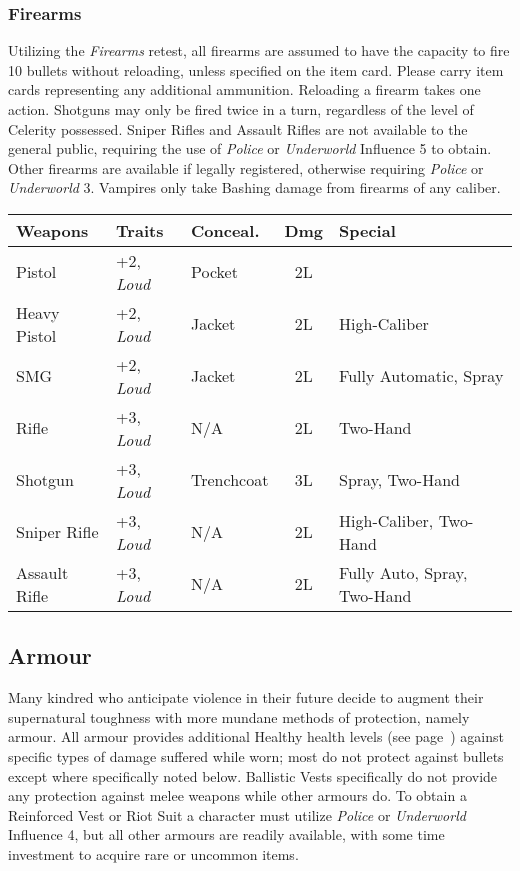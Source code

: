 \subsubsection{Firearms}
Utilizing the \emph{Firearms} retest, all firearms are assumed to have the capacity to 
fire 10 bullets without reloading, unless specified on the item card.  Please carry item 
cards representing any additional ammunition.  Reloading a firearm takes one action.  
Shotguns may only be fired twice in a turn, regardless of the level of Celerity possessed.  
Sniper Rifles and Assault Rifles are not available to the general public, requiring the 
use of \emph{Police} or \emph{Underworld} Influence 5 to obtain.  Other firearms are 
available if legally registered, otherwise requiring \emph{Police} or \emph{Underworld} 3. 
Vampires only take Bashing damage from firearms of any caliber.  \\

{\footnotesize
\begin{tabular}{|l l l c l|}
	\hline
	\textbf{Weapons} & \textbf{Traits} & \textbf{Conceal.} & 
	\textbf{Dmg} & \textbf{Special} \\
	\hline
	Pistol & +2, \emph{Loud} & Pocket & 2L & \\
	Heavy Pistol & +2, \emph{Loud} & Jacket & 2L & High-Caliber \\
	SMG & +2, \emph{Loud} & Jacket & 2L & Fully Automatic, Spray \\
	Rifle & +3, \emph{Loud} & N/A & 2L & Two-Hand \\
	Shotgun & +3, \emph{Loud} & Trenchcoat & 3L & Spray, Two-Hand \\
	Sniper Rifle & +3, \emph{Loud} & N/A & 2L & High-Caliber, Two-Hand \\
	Assault Rifle & +3, \emph{Loud} & N/A & 2L & Fully Auto, Spray, Two-Hand \\
	\hline
\end{tabular}
}

\subsection{Armour}
Many kindred who anticipate violence in their future decide to augment their supernatural 
toughness with more mundane methods of protection, namely armour.  All armour provides 
additional Healthy health levels (see page~\pageref{sec:health}) against specific types 
of damage suffered while worn; most do not protect against bullets except where specifically 
noted below.  Ballistic Vests specifically do not provide any protection against melee weapons 
while other armours do.  To obtain a Reinforced Vest or Riot Suit a character must 
utilize \emph{Police} or \emph{Underworld} Influence 4, but all other armours are readily available, 
with some time investment to acquire rare or uncommon items. 

